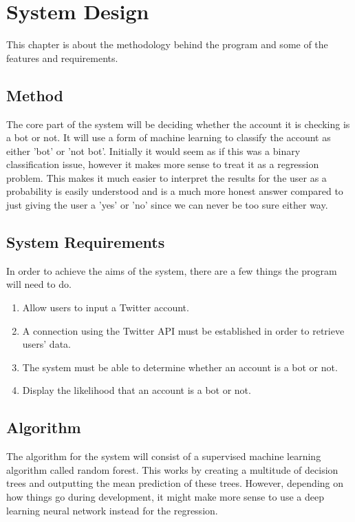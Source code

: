 
\chapter{System Design}

\label{Chapter3}
This chapter is about the methodology behind the program and some of the features and requirements.

\section{Method}
The core part of the system will be deciding whether the account it is checking is a bot or not. It will use a form of machine learning to classify the account as either 'bot' or 'not bot'. Initially it would seem as if this was a binary classification issue, however it makes more sense to treat it as a regression problem. This makes it much easier to interpret the results for the user as a probability is easily understood and is a much more honest answer compared to just giving the user a 'yes' or 'no' since we can never be too sure either way.


\section{System Requirements}
In order to achieve the aims of the system, there are a few things the program will need to do.
\begin{enumerate}
	\item Allow users to input a Twitter account.
	\item A connection using the Twitter API must be established in order to retrieve users' data.
	\item The system must be able to determine whether an account is a bot or not.
	\item Display the likelihood that an account is a bot or not.
\end{enumerate}

\section{Algorithm}
The algorithm for the system will consist of a supervised machine learning algorithm called random forest. This works by creating a multitude of decision trees and outputting the mean prediction of these trees. However, depending on how things go during development, it might make more sense to use a deep learning neural network instead for the regression. 


